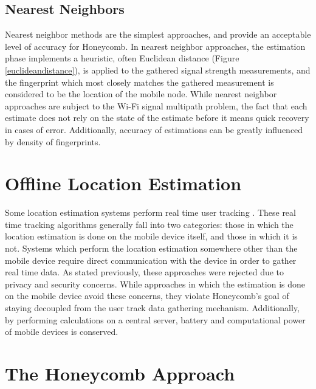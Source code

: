 \subsection{Nearest Neighbors} Nearest neighbor methods \cite{quan2010wi} \cite{nagaosa2012dept} are the simplest approaches, and provide an acceptable level of accuracy for Honeycomb. In nearest neighbor approaches, the estimation phase implements a heuristic, often Euclidean distance (Figure \ref{euclideandistance}), is applied to the gathered signal strength measurements, and the fingerprint which most closely matches the gathered measurement is considered to be the location of the mobile node. While nearest neighbor approaches are subject to the Wi-Fi signal multipath problem, the fact that each estimate does not rely on the state of the estimate before it means quick recovery in cases of error. Additionally, accuracy of estimations can be greatly influenced by density of fingerprints. 


\section{Offline Location Estimation}

Some location estimation systems perform real time user tracking \cite{bahl2000enhancements} \cite{bahl2000radar} \cite{ito2005bayesian}. These real time tracking algorithms generally fall into two categories: those in which the location estimation is done on the mobile device itself, and those in which it is not. Systems which perform the location estimation somewhere other than the mobile device require direct communication with the device in order to gather real time data. As stated previously, these approaches were rejected due to privacy and security concerns. While approaches in which the estimation is done on the mobile device avoid these concerns, they violate Honeycomb's goal of staying decoupled from the user track data gathering mechanism. Additionally, by performing calculations on a central server, battery and computational power of mobile devices is conserved. 


\section{The Honeycomb Approach}

